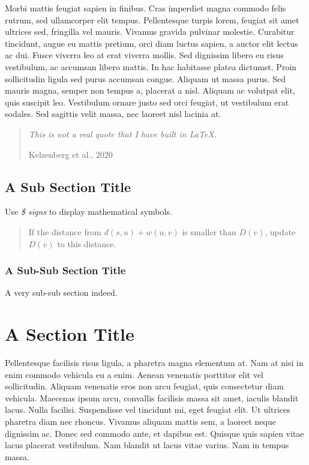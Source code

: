 Morbi mattis feugiat sapien in finibus. Cras imperdiet magna commodo felis rutrum, sed ullamcorper elit tempus. Pellentesque turpis lorem, feugiat sit amet ultrices sed, fringilla vel mauris. Vivamus gravida pulvinar molestie. Curabitur tincidunt, augue eu mattis pretium, orci diam luctus sapien, a auctor elit lectus ac dui. Fusce viverra leo at erat viverra mollis. Sed dignissim libero eu risus vestibulum, ac accumsan libero mattis. In hac habitasse platea dictumst. Proin sollicitudin ligula sed purus accumsan congue. Aliquam ut massa purus. Sed mauris magna, semper non tempus a, placerat a nisl. Aliquam ac volutpat elit, quis suscipit leo. Vestibulum ornare justo sed orci feugiat, ut vestibulum erat sodales. Sed sagittis velit massa, nec laoreet nisl lacinia at.

\begin{quote}
  \emph{This is not a real quote that I have built in \LaTeX.}

  \hfill{Kelzenberg et al., 2020 \cite{ARTICLE:Dijkstra:1}}
\end{quote}

\subsection{A Sub Section Title}

Use \emph{\$ signs} to display mathematical symbols.

\begin{quote}
  If the distance from $d(s,u)+w(u,v)$ is smaller than $D(v)$, update $D(v)$ to this distance.
\end{quote}

\subsubsection{A Sub-Sub Section Title}

A very sub-sub section indeed.


\section{A Section Title}

Pellentesque facilisis risus ligula, a pharetra magna elementum at. Nam at nisi in enim commodo vehicula eu a enim. Aenean venenatis porttitor elit vel sollicitudin. Aliquam venenatis eros non arcu feugiat, quis consectetur diam vehicula. Maecenas ipsum arcu, convallis facilisis massa sit amet, iaculis blandit lacus. Nulla facilisi. Suspendisse vel tincidunt mi, eget feugiat elit. Ut ultrices pharetra diam nec rhoncus. Vivamus aliquam mattis sem, a laoreet neque dignissim ac. Donec sed commodo ante, et dapibus est. Quisque quis sapien vitae lacus placerat vestibulum. Nam blandit ut lacus vitae varius. Nam in tempus massa.

